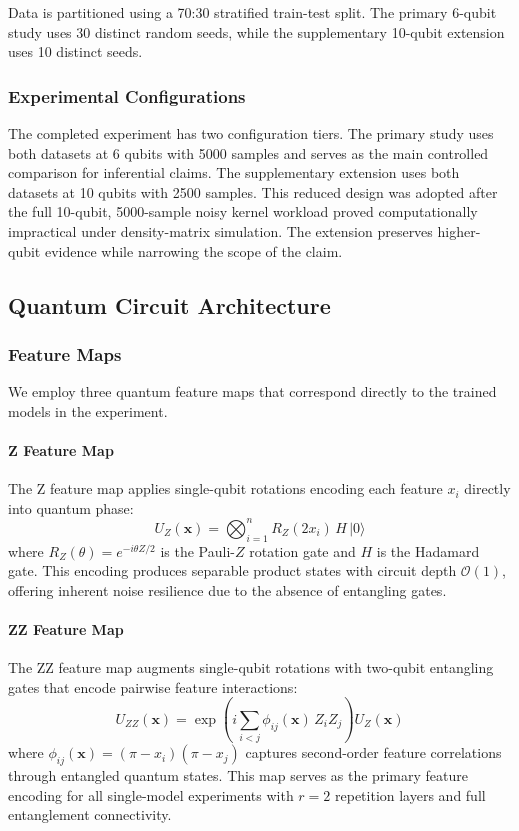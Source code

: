 \documentclass{ieeeaccess}
\begin{document}
Data is partitioned using a 70:30 stratified train-test split. The primary 6-qubit study uses 30 distinct random seeds, while the supplementary 10-qubit extension uses 10 distinct seeds.

\subsubsection{Experimental Configurations}
The completed experiment has two configuration tiers. The primary study uses both datasets at 6 qubits with 5000 samples and serves as the main controlled comparison for inferential claims. The supplementary extension uses both datasets at 10 qubits with 2500 samples. This reduced design was adopted after the full 10-qubit, 5000-sample noisy kernel workload proved computationally impractical under density-matrix simulation. The extension preserves higher-qubit evidence while narrowing the scope of the claim.

\subsection{Quantum Circuit Architecture}
\label{sec:circuit_architecture}

\subsubsection{Feature Maps}
We employ three quantum feature maps that correspond directly to the trained models in the experiment.

\paragraph{Z Feature Map} The Z feature map applies single-qubit rotations encoding each feature $x_i$ directly into quantum phase:
\begin{equation}
U_Z(\mathbf{x}) = \bigotimes_{i=1}^{n} R_Z(2x_i)\, H\, |0\rangle
\label{eq:z_map}
\end{equation}
where $R_Z(\theta) = e^{-i\theta Z/2}$ is the Pauli-$Z$ rotation gate and $H$ is the Hadamard gate. This encoding produces separable product states with circuit depth $\mathcal{O}(1)$, offering inherent noise resilience due to the absence of entangling gates.

\paragraph{ZZ Feature Map} The ZZ feature map augments single-qubit rotations with two-qubit entangling gates that encode pairwise feature interactions:
\begin{equation}
U_{ZZ}(\mathbf{x}) = \exp\!\left(i \sum_{i<j} \phi_{ij}(\mathbf{x})\, Z_i Z_j\right) U_Z(\mathbf{x})
\label{eq:zz_map}
\end{equation}
where $\phi_{ij}(\mathbf{x}) = (\pi - x_i)(\pi - x_j)$ captures second-order feature correlations through entangled quantum states. This map serves as the primary feature encoding for all single-model experiments with $r = 2$ repetition layers and full entanglement connectivity.
\end{document}

